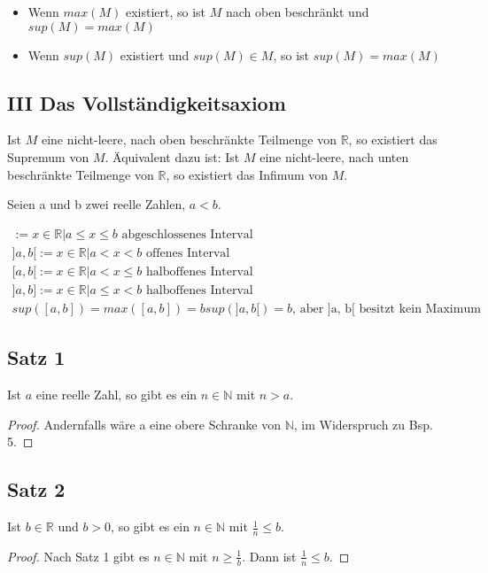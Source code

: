 \documentclass[a4paper,10pt]{article}
\begin{document}
\begin{itemize}
 \item Wenn $max(M)$ existiert, so ist $M$ nach oben beschränkt und $sup(M) = max(M)$
 \item Wenn $sup(M)$ existiert und $sup(M) \in M$, so ist $sup(M) = max(M)$
\end{itemize}

\subsection{III Das Vollständigkeitsaxiom}

Ist $M$ eine nicht-leere, nach oben beschränkte Teilmenge von $\mathbb{R}$, so existiert das Supremum von $M$.
Äquivalent dazu ist: Ist $M$ eine nicht-leere, nach unten beschränkte Teilmenge von $\mathbb{R}$, so existiert das Infimum von $M$.

Seien a und b zwei reelle Zahlen, $a < b$.

\begin{align}
 [a, b] := {x \in \mathbb{R} | a \le x \le b} \text{ abgeschlossenes Interval}\\
 ]a, b[ := {x \in \mathbb{R} | a < x < b} \text{ offenes Interval}\\
 [a, b[ := {x \in \mathbb{R} | a < x \le b} \text{ halboffenes Interval}\\
 ]a, b] := {x \in \mathbb{R} | a \le x < b} \text{ halboffenes Interval}\\
 sup([a, b]) = max([a, b]) = b
 sup(]a, b[) = b\text{, aber ]a, b[ besitzt kein Maximum}
\end{align}

\subsection{Satz 1}
Ist $a$ eine reelle Zahl, so gibt es ein $n \in \mathbb{N}$ mit $n > a$.
\begin{proof}
 Andernfalls wäre a eine obere Schranke von $\mathbb{N}$, im Widerspruch zu Bsp. 5.
\end{proof}

\subsection{Satz 2}

Ist $b \in \mathbb{R}$ und $b > 0$, so gibt es ein $n \in \mathbb{N}$ mit $\frac{1}{n} \le b$.

\begin{proof}
 Nach Satz 1 gibt es $n \in \mathbb{N}$ mit $n \ge \frac{1}{b}$. Dann ist $\frac{1}{n} \le b$.
\end{proof}
\end{document}
